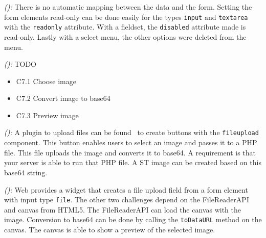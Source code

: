 \documentclass[a4paper]{artikel3}
\newcommand{\code}[1]{\texttt{#1}}
\newcommand{\setspace}[0]{\vspace{2mm}}
\renewcommand{\paragraph}[1]{\setspace \noindent {\bf #1}  }
\newcommand{\framework}[2]{ \emph{#1 (\textbf{#2}): }} %
\newcommand{\challenge}[1]{\paragraph{#1}}
\begin{document}
\framework{\jqma{}}{}
There is no automatic mapping between the data and the form.
Setting the form elements read-only can be done easily for the types \code{input} and \code{textarea} with the \code{readonly} attribute.
With a fieldset, the \code{disabled} attribute made is read-only.
Lastly with a select menu, the other options were deleted from the menu.

\framework{\lungoa{}}{}
TODO


% 
% 
% 

\challenge{\chal{afbeelding}}
\begin{itemize}
  \item C7.1 Choose image
  \item C7.2 Convert image to base64
  \item C7.3 Preview image
\end{itemize}

\framework{\sta{}}{}
A plugin to upload files can be found~\cite{Smirnov2012} to create buttons with the \code{fileupload} component.  
This button enables users to select an image and passes it to a PHP file.  
This file uploads the image and converts it to base64.
A requirement is that your server is able to run that PHP file.    
A ST image can be created based on this base64 string.

\framework{\kendoa{}}{}
\kendo{} Web provides a widget that creates a file upload field from a form element with input type \code{file}.
The other two challenges depend on the FileReaderAPI and canvas from HTML5.
The FileReaderAPI can load the canvas with the image.
Conversion to base64 can be done by calling the \code{toDataURL} method on the canvas.
The canvas is able to show a preview of the selected image.
\end{document}
